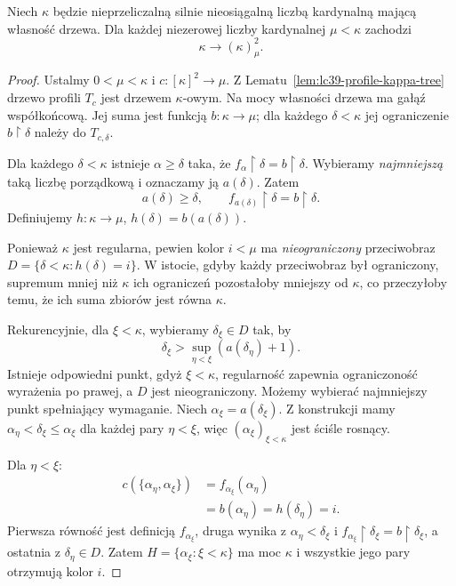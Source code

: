 \begin{twierdzenie}
\label{thm:lc39-tree-to-partition}
Niech $\kappa$ będzie nieprzeliczalną
silnie nieosiągalną liczbą kardynalną
mającą własność drzewa.
Dla każdej niezerowej liczby
kardynalnej $\mu<\kappa$ zachodzi
\[
 \kappa\longrightarrow(\kappa)^2_\mu.
\]
\end{twierdzenie}
\begin{proof}
Ustalmy $0<\mu<\kappa$ i
$c:[\kappa]^2\to\mu$.
Z Lematu~\ref{lem:lc39-profile-kappa-tree}
drzewo profili $T_c$ jest
drzewem $\kappa$-owym.
Na mocy własności drzewa
ma gałąź współkońcową.
Jej suma jest funkcją
$b:\kappa\to\mu$;
dla każdego $\delta<\kappa$
jej ograniczenie
$b\restriction\delta$
należy do $T_{c,\delta}$.

Dla każdego $\delta<\kappa$
istnieje $\alpha\ge\delta$
taka, że
$f_\alpha\restriction\delta
 =b\restriction\delta$.
Wybieramy \emph{najmniejszą}
taką liczbę porządkową
i oznaczamy ją $a(\delta)$.
Zatem
\[
 a(\delta)\ge\delta,\qquad
 f_{a(\delta)}\restriction\delta
       =b\restriction\delta.
\]
Definiujemy $h:\kappa\to\mu$,
$h(\delta)=b(a(\delta))$.

Ponieważ $\kappa$ jest regularna,
pewien kolor $i<\mu$ ma
\emph{nieograniczony} przeciwobraz
$D=\{\delta<\kappa:h(\delta)=i\}$.
W istocie, gdyby każdy przeciwobraz
był ograniczony, supremum
mniej niż $\kappa$ ich ograniczeń
pozostałoby mniejszy od $\kappa$,
co przeczyłoby temu, że
ich suma zbiorów jest równa $\kappa$.

Rekurencyjnie, dla $\xi<\kappa$,
wybieramy $\delta_\xi\in D$
tak, by
\[
 \delta_\xi>
    \sup_{\eta<\xi}(a(\delta_\eta)+1).
\]
Istnieje odpowiedni punkt,
gdyż $\xi<\kappa$,
regularność zapewnia ograniczoność
wyrażenia po prawej, a $D$
jest nieograniczony.
Możemy wybierać najmniejszy
punkt spełniający wymaganie.
Niech $\alpha_\xi=a(\delta_\xi)$.
Z konstrukcji mamy
$\alpha_\eta<\delta_\xi\le\alpha_\xi$
dla każdej pary $\eta<\xi$,
więc $(\alpha_\xi)_{\xi<\kappa}$
jest ściśle rosnący.

Dla $\eta<\xi$:
\[
 \begin{aligned}
 c(\{\alpha_\eta,\alpha_\xi\})
 &=f_{\alpha_\xi}(\alpha_\eta)\\
 &=b(\alpha_\eta)
   =h(\delta_\eta)=i.
 \end{aligned}
\]
Pierwsza równość jest definicją
$f_{\alpha_\xi}$, druga wynika z
$\alpha_\eta<\delta_\xi$ i
$f_{\alpha_\xi}\restriction\delta_\xi
 =b\restriction\delta_\xi$,
a ostatnia z $\delta_\eta\in D$.
Zatem $H=\{\alpha_\xi:\xi<\kappa\}$
ma moc $\kappa$ i wszystkie
jego pary otrzymują kolor $i$.
\end{proof}

